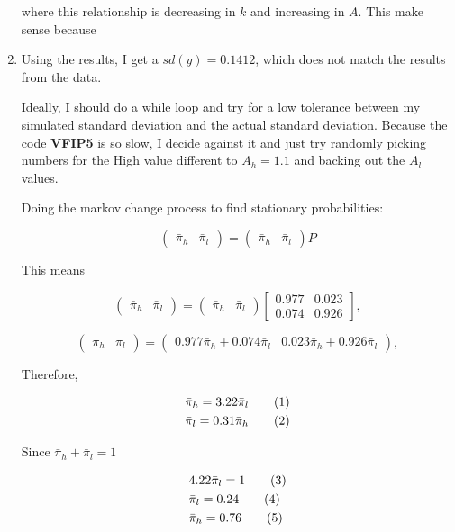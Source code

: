 \documentclass[12pt]{article}%
\newcommand\numberthis{\addtocounter{equation}{1}\tag{\theequation}}
\begin{document}
\begin{enumerate}
	where this relationship is decreasing in $k$ and increasing in $A$. This make sense because 

	
	\item Using the results, I get a $sd(y)= 0.1412$, which does not match the results from the data. 
	
		 Ideally, I should do a while loop and try for a low tolerance between my simulated standard deviation and the actual standard deviation. Because the code \textbf{VFIP5} is so slow, I decide against it and just try randomly picking numbers for the High value different to $A_h=1.1$ and backing out the $A_l$ values.	 	
	
	Doing the markov change process to find stationary probabilities:
	
		\[
	\begin{pmatrix}\bar{\pi}_{h} & \bar{\pi}_{l}\end{pmatrix}=\begin{pmatrix}\bar{\pi}_{h} & \bar{\pi}_{l}\end{pmatrix}P
	\]
	
	This means
	
	\[
	\begin{pmatrix}\bar{\pi}_{h} & \bar{\pi}_{l}\end{pmatrix}=\begin{pmatrix}\bar{\pi}_{h} & \bar{\pi}_{l}\end{pmatrix}\left[\begin{array}{cc}
	0.977 & 0.023\\
	0.074 & 0.926
	\end{array}\right],
	\]
	
			\[
	\begin{pmatrix}\bar{\pi}_{h} & \bar{\pi}_{l}\end{pmatrix}=\begin{pmatrix} 0.977\bar{\pi}_{h}+ 0.074\bar{\pi}_{l} & 	0.023\bar{\pi}_{h}+0.926\bar{\pi}_{l}\end{pmatrix},
	\]
	
		Therefore,
	
	\begin{align*}
	&\bar{\pi}_{h}=  3.22 \bar{\pi}_{l}  \numberthis \\
	&\bar{\pi}_{l}=  0.31 \bar{\pi}_{h} \numberthis \\	
	\end{align*}
	
		Since $\bar{\pi}_{h}+\bar{\pi}_{l}=1$
	
	\begin{align*}
	&4.22\bar{\pi}_{l}= 1 \numberthis \\
	&\bar{\pi}_{l}= 0.24  \numberthis \\
	&\bar{\pi}_{h}=  0.76   \numberthis \\	
	\end{align*}
	

\end{enumerate}
\end{document}
